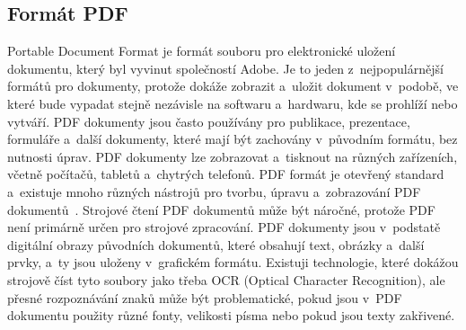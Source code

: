 \subsection*{Formát PDF}
Portable Document Format je formát souboru pro elektronické uložení dokumentu, který byl vyvinut společností Adobe. Je to jeden z~nejpopulárnější formátů pro dokumenty, protože dokáže zobrazit a~uložit dokument v~podobě, ve které bude vypadat stejně nezávisle na softwaru a~hardwaru, kde se prohlíží nebo vytváří. PDF dokumenty jsou často používány pro publikace, prezentace, formuláře a~další dokumenty, které mají být zachovány v~původním formátu, bez nutnosti úprav. PDF dokumenty lze zobrazovat a~tisknout na různých zařízeních, včetně počítačů, tabletů a~chytrých telefonů. PDF formát je otevřený standard a~existuje mnoho různých nástrojů pro tvorbu, úpravu a~zobrazování PDF dokumentů~\cite{iso32000-1}. Strojové čtení PDF dokumentů může být náročné, protože PDF není primárně určen pro strojové zpracování. PDF dokumenty jsou v~podstatě digitální obrazy původních dokumentů, které obsahují text, obrázky a~další prvky, a~ty jsou uloženy v~grafickém formátu.
Existuji technologie, které dokážou strojově číst tyto soubory jako třeba OCR (Optical Character Recognition), ale přesné rozpoznávání znaků může být problematické, pokud jsou v~PDF dokumentu použity různé fonty, velikosti písma nebo pokud jsou texty zakřivené.

